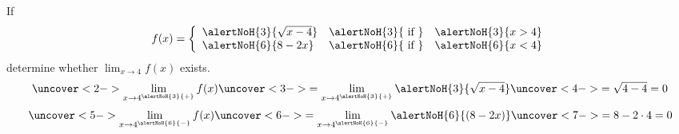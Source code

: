 \begin{frame}
\begin{example}%
If
\[
f(x) = \left\{ \begin{array}{lcr}
\alertNoH{ 3}{\sqrt{x-4}} & \alertNoH{ 3}{\text{ if }} & \alertNoH{ 3}{x > 4} \\
\alertNoH{ 6}{8 - 2x} & \alertNoH{ 6}{\text{ if }} & \alertNoH{ 6}{x < 4}
\end{array}\right.
\]
determine whether $\lim_{x\rightarrow 4} f(x)$ exists.
\[
\uncover<2->{\lim_{x\rightarrow 4^{\alertNoH{ 3}{+}}}f(x)} \uncover<3->{ = \lim_{x\rightarrow 4^{\alertNoH{ 3}{+}}}\alertNoH{ 3}{\sqrt{x-4}}} \uncover<4->{ = \sqrt{4 - 4} = 0}
\]
\[
\uncover<5->{\lim_{x\rightarrow 4^{\alertNoH{ 6}{-}}}f(x)} \uncover<6->{ = \lim_{x\rightarrow 4^{\alertNoH{ 6}{-}}}\alertNoH{ 6}{(8 - 2x)}} \uncover<7->{ = 8 - 2\cdot 4 = 0}
\]
\end{example}
\end{frame}
